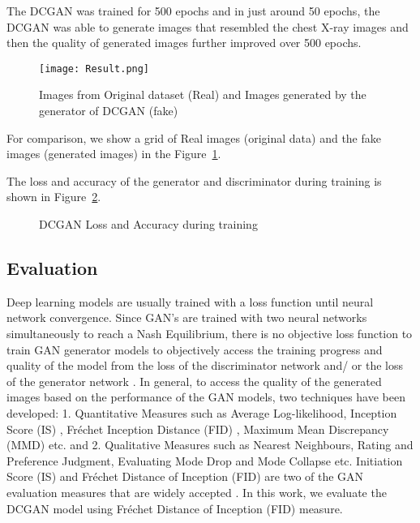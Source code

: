 \documentclass{article}
\begin{document}
The DCGAN was trained for 500 epochs and in just around 50 epochs, the DCGAN was able to generate images that resembled the chest X-ray images and then the quality of generated images further improved over 500 epochs. 
\begin{figure}[htbp]
\centering
\texttt{[image: Result.png]}
\caption{Images from Original dataset (Real) and Images generated by the generator of DCGAN (fake)}
\label{fig:Result}
\end{figure}
For comparison, we show a grid of Real images (original data) and the fake images (generated images) in the Figure~\ref{fig:Result}.

The loss and accuracy of the generator and discriminator during training is shown in Figure~\ref{fig:DCGANlossacc}.

\begin{figure}[htbp]
    \centering
    \qquad
    \caption{DCGAN Loss and Accuracy during training}\label{fig:DCGANlossacc}\end{figure}

\subsection*{Evaluation}

Deep learning models are usually trained with a loss function until neural network convergence. Since GAN's are trained with two neural networks simultaneously to reach a Nash Equilibrium, there is no objective loss function to train GAN generator models to objectively access the training progress and quality of the model from the loss of the discriminator network and/ or the loss of the generator network \cite{salimans2016improved}. In general, to access the quality of the generated images based on the performance of the GAN models, two techniques have been developed: 1. Quantitative Measures such as Average Log-likelihood, Inception Score (IS) \cite{salimans2016improved}, Fréchet Inception Distance (FID) \cite{heusel2017gans}, Maximum Mean Discrepancy (MMD) \cite{ASENS_1953_3_70_3_267_0} etc. and 2. Qualitative Measures such as Nearest Neighbours, Rating and Preference Judgment, Evaluating Mode Drop and Mode Collapse \cite{srivastava2017veegan} etc. Initiation Score (IS) and Fréchet Distance of Inception (FID) are two of the GAN evaluation measures that are widely accepted \cite{borji2018pros}. In this work, we evaluate the DCGAN model using Fréchet Distance of Inception (FID) measure.
\end{document}
